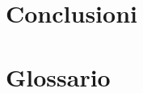 \documentclass[target=bach,aauheader=]{thud}
\begin{document}
\chapter{Conclusioni}

\appendix


\chapter{Glossario}


\backmatter




\end{document}
